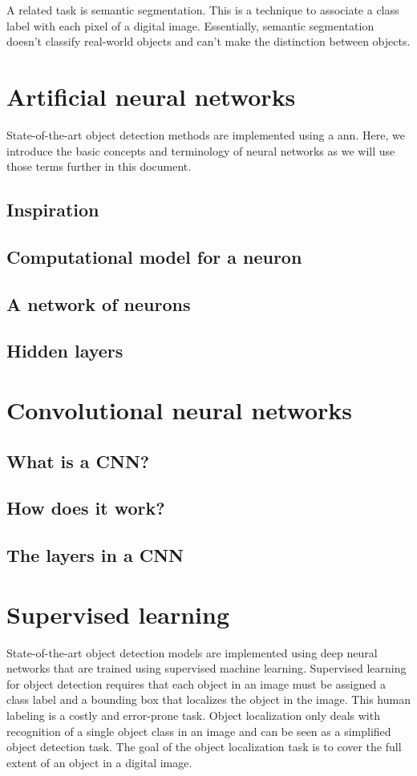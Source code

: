 A related task is semantic segmentation. This is a technique to associate a class label with each pixel of a digital image. Essentially, semantic segmentation doesn't classify real-world objects and can't make the distinction between objects.

\section{Artificial neural networks}
State-of-the-art object detection methods are implemented using a \acrfull{ann}. Here, we introduce the basic concepts and terminology of neural networks as we will use those terms further in this document. 

\subsection{Inspiration}
\subsection{Computational model for a neuron}
\subsection{A network of neurons}
\subsection{Hidden layers}

\section{Convolutional neural networks}
\subsection{What is a CNN?}
\subsection{How does it work?}
\subsection{The layers in a CNN}

\section{Supervised learning}
State-of-the-art object detection models are implemented using deep neural networks that are trained using supervised machine learning. Supervised learning for object detection requires that each object in an image must be assigned a class label and a bounding box that localizes the object in the image. This human labeling is a costly and error-prone task. Object localization only deals with recognition of a single object class in an image and can be seen as a simplified object detection task. The goal of the object localization task is to cover the full extent of an object in a digital image.

